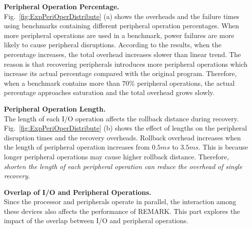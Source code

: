 \vspace{5pt}
\noindent\textbf{Peripheral Operation Percentage.} \\
Fig.~\ref{fig:ExpPeriOperDistribute} (a) shows the overheads and the failure times using benchmarks containing different peripheral operation percentages.
When more peripheral operations are used in a benchmark, power failures are more likely to cause peripheral disruptions.
According to the results, when the percentage increases, the total overhead increases slower than linear trend.
The reason is that recovering peripherals introduces more peripheral operations which increase its actual percentage compared with the original program.
Therefore, when a benchmark contains more than $70\%$ peripheral operations, the actual percentage approaches saturation and the total overhead grows slowly.

\vspace{5pt}
\noindent\textbf{Peripheral Operation Length.} \\
The length of each I/O operation affects the rollback distance during recovery.
Fig.~\ref{fig:ExpPeriOperDistribute} (b) shows the effect of lengths on the peripheral disruption times and the recovery overheads.
Rollback overhead increases when the length of peripheral operation increases from $0.5ms$ to $3.5ms$.
This is because longer peripheral operations may cause higher rollback distance.
Therefore, \emph{shorten the length of each peripheral operation can reduce the overhead of single recovery}.

\begin{comment}
Fig.~\ref{fig:ExpPeriOperDistribute} (b) shows that more peripheral disruptions take place when the length grows.
In statistics analysis, the peripheral disruption rate is affected only by peripheral operation percentage.
However, longer peripheral recover procedure increases this percentage, causes significant avalanche effects and leads to higher peripheral disruption rate.
In conclusion, \emph{the longer I/O operation length also increases the I/O disruption probability because of the avalanche effect}.
\end{comment}

\vspace{5pt}
\noindent\textbf{Overlap of I/O and Peripheral Operations.} \\
%
Since the processor and peripherals operate in parallel, the interaction among these devices also affects the performance of REMARK.
This part explores the impact of the overlap between I/O and peripheral operations.


